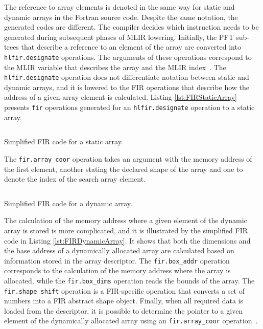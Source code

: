 \documentclass[acmtog,natbib=false]{acmart}
\newcommand{\code}[1]{\texttt{#1}\xspace}
\begin{document}
The reference to array elements is denoted in the same way for static and dynamic arrays in the Fortran source code.
Despite the same notation, the generated codes are different.
The compiler decides which instruction needs to be generated during subsequent phases of \ac{MLIR} lowering.
Initially, the \ac{PFT} sub-trees that describe a reference to an element of the array are converted into \code{hlfir.designate} operations.
The arguments of these operations correspond to the \ac{MLIR} variable that describes the array and the \ac{MLIR} index~\cite{LLVM25}.
The \code{hlfir.designate} operation does not differentiate notation between static and dynamic arrays, and it is lowered to the FIR operations that describe how the address of a given array element is calculated.
Listing \ref{lst:FIRStaticArray} presents \code{fir} operations generated for an \code{hlfir.designate} operation to a static array.


\begin{listing}[t]
\inputminted{MLIR-lexer.py:MlirLexer -x}{code/FIR_static_array.mlir}
\caption{Simplified FIR code for a static array.}
\label{lst:FIRStaticArray}
\end{listing}

The \code{fir.array\_coor} operation takes an argument with the memory address of the first element, another stating the declared shape of the array and one to denote the index of the search array element.

\begin{listing}[t]
\inputminted{MLIR-lexer.py:MlirLexer -x}{code/FIR_dynamic_array.mlir}
\caption{Simplified FIR code for a dynamic array.}
\label{lst:FIRDynamicArray}
\end{listing}

The calculation of the memory address where a given element of the dynamic array is stored is more complicated, and it is illustrated by the simplified \ac{FIR} code in Listing \ref{lst:FIRDynamicArray}.
It shows that both the dimensions and the base address of a dynamically allocated array are calculated based on information stored in the array descriptor.
The \code{fir.box\_addr} operation corresponds to the calculation of the memory address where the array is allocated, while the \code{fir.box\_dims} operation reads the bounds of the array.
The \code{fir.shape\_shift} operation is a \ac{FIR}-specific operation that converts a set of numbers into a \ac{FIR} abstract shape object.
Finally, when all required data is loaded from the descriptor, it is possible to determine the pointer to a given element of the dynamically allocated array using an \code{fir.array\_coor} operation~\cite{LLVM25}.
\end{document}
